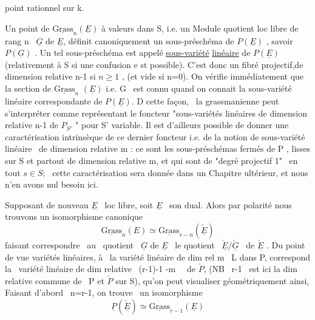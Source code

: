 
point rationnel sur k.

Un point de $\underline{\mathrm{Grass}}_n(\underline{E})$ à valeurs dans S, i.e. un Module quotient
loc libre de rang n \ $\underline{G}$ de $\underline{E}$, définit canoniquement un sous-préschéma
de $P(\underline{E})$ , savoir $P(\underline{G})$ . Un tel sous-préschéma est appelé \uline{sous-variété}
\uline{linéaire} de $P(\underline{E})$ (relativement à S si une confusion e st possible).
C'est donc un fibré projectif,de dimension relative n-1 si $n\geqslant 1$ ,
(et vide si n=0). On vérifie immédiatement que la section de $\underline{\mathrm{Grass}}_n$
$(\underline{E})$ i.e. G \ est connu quand on connait la sous-variété linéaire
correspondante de $P(\underline{E})$. D cette façon, \ la grassmanienne peut
s'interpréter comme représentant le foncteur "sous-variétés linéaires
de dimension relative n-1  de $P_{S'}$ " pour S'
variable. Il est d'ailleurs possible de donner une caractérisation
intrinsèque de ce dernier foncteur i.e. de la notion de sous-variété
linéaire \ de dimension relative m : ce sont les sous-préschémas fermés
de P , lisses sur S et partout de dimension relative m, et qui sont
de "degré projectif 1" \ en tout $s\in S$; \ cette caractérisation sera
donnée dans un Chapitre ultérieur, et nous n'en avons nul besoin ici.

Supposant de nouveau $\underline{E}$ \ loc libre, soit $\underline{E}$ \ son dual. Alors
par polarité nous trouvons un isomorphisme canonique
\[ \underline{\mathrm{Grass}}_n(E) \simeq \underline{\mathrm{Grass}}_{r-n}(\check{\underline{E}}) \]
faisant correspondre \ au \ quotient \ $\underline{G}$ de $\underline{E}$ \ le quotient \ $\check{\underline{E}}/\check{\underline{G}}$ \ de $\check{\underline{E}}$ .
Du point de vue variétés linéaires, à \ la variété linéaire de dim rel
m \ L dans P, correspond la \ variété linéaire de dim relative
 \ (r-1)-1 -m \ \ de $\check{P}$, (NB \ r-1 \ est ici la dim relative
commune de \ P et $\check{P}$ sur S), qu'on peut visualiser géométriquement ainsi,
Faisant d'abord \ n=r-1, on trouve \ un isomorphisme
\[ \underline{P}(\check{\underline{E}}) \simeq \underline{\mathrm{Grass}}_{r-1}(\underline{E}) \]

